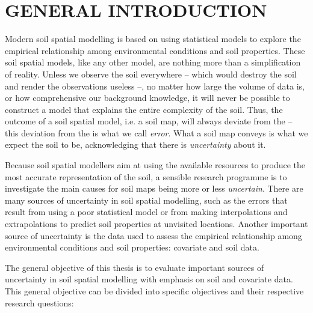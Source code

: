 \setcounter{page}{1}
\artigofalse
\chapter{GENERAL INTRODUCTION}
\label{chap:chap01}

Modern soil spatial modelling is based on using statistical models to explore the empirical relationship among 
environmental conditions and soil properties. These soil spatial models, like any other model, are nothing 
more than a simplification of reality. Unless we observe the soil everywhere -- which would destroy the 
soil and render the observations useless --, no matter how large the volume of data is, or how comprehensive 
our background knowledge, it will never be possible to construct a model that explains the entire complexity 
of the soil. Thus, the outcome of a soil spatial model, i.e. a soil map, will always deviate from the 
 -- this deviation from the  is what we call \emph{error}. What a soil map conveys is what 
we expect the soil to be, acknowledging that there is \emph{uncertainty} about it.

Because soil spatial modellers aim at using the available resources to produce the most accurate 
representation of the soil, a sensible research programme is to investigate the main causes for soil maps 
being more or less \emph{uncertain}. There are many sources of uncertainty in soil spatial modelling, such as 
the errors that result from using a poor statistical model or from making interpolations and extrapolations 
to predict soil properties at unvisited locations. Another important source of uncertainty is the data used to 
assess the empirical relationship among environmental conditions and soil properties: covariate and soil data.

The general objective of this thesis is to evaluate important sources of uncertainty in soil spatial modelling 
with emphasis on soil and covariate data. This general objective can be divided into specific objectives and 
their respective research questions:

